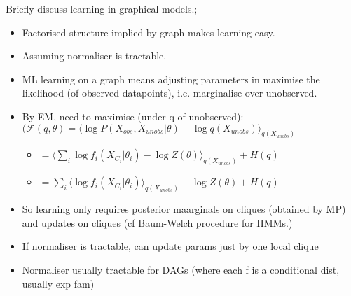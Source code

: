 \documentclass{article}
\begin{document}
Briefly discuss learning in graphical models.; \begin{itemize} \item Factorised structure implied by graph makes learning easy.  \item Assuming normaliser is tractable.  \item ML learning on a graph means adjusting parameters in maximise the likelihood (of observed datapoints), i.e. marginalise over unobserved.  \item By EM, need to maximise (under q of unobserved): $\mathcal{(F}(q,\theta)=\langle \log P(X_{obs}, X_{unobs}|\theta) - \log q(X_{unobs})\rangle_{q(X_{unobs})}$ \begin{itemize} \item $=\langle \sum_i\log f_i(X_{C_i}|\theta_i)-\log Z(\theta)\rangle_{q(X_{unobs})} + H(q)$ \item $=\sum_i\langle \log f_i(X_{C_i}|\theta_i)\rangle_{q(X_{unobs})} -\log Z(\theta)+H(q)$ \end{itemize} \item So learning only requires posterior maarginals on cliques (obtained by MP) and updates on cliques (cf Baum-Welch procedure for HMMs.) \item If normaliser is tractable, can update params just by one local clique \item Normaliser usually tractable for DAGs (where each f is a conditional dist, usually exp fam) \end{itemize}
\end{document}
